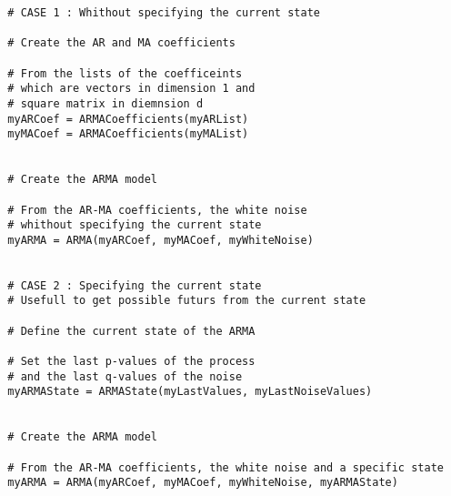 \begin{lstlisting}
  # CASE 1 : Whithout specifying the current state

  # Create the AR and MA coefficients

  # From the lists of the coefficeints
  # which are vectors in dimension 1 and 
  # square matrix in diemnsion d
  myARCoef = ARMACoefficients(myARList)
  myMACoef = ARMACoefficients(myMAList)
  
  
  # Create the ARMA model

  # From the AR-MA coefficients, the white noise 
  # whithout specifying the current state
  myARMA = ARMA(myARCoef, myMACoef, myWhiteNoise)

   
  # CASE 2 : Specifying the current state
  # Usefull to get possible futurs from the current state 

  # Define the current state of the ARMA
  
  # Set the last p-values of the process 
  # and the last q-values of the noise
  myARMAState = ARMAState(myLastValues, myLastNoiseValues)
  
  
  # Create the ARMA model
 
  # From the AR-MA coefficients, the white noise and a specific state
  myARMA = ARMA(myARCoef, myMACoef, myWhiteNoise, myARMAState)
\end{lstlisting}

